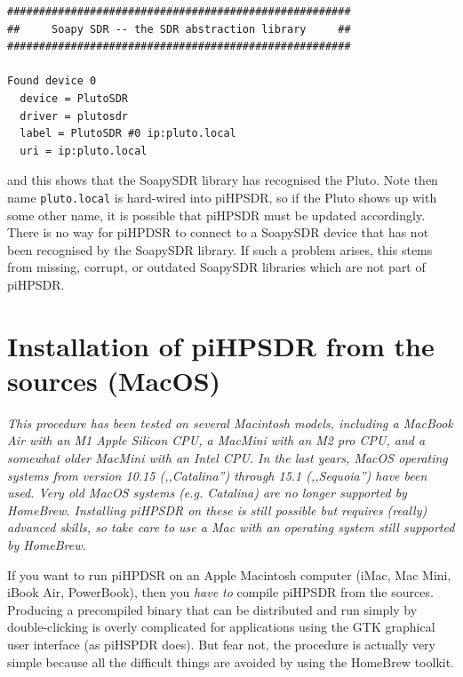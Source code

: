 \documentclass[12pt]{book}
\def\pH{pi\-HPSDR\xspace}
\begin{document}
\begin{small}
\begin{verbatim}
######################################################
##     Soapy SDR -- the SDR abstraction library     ##
######################################################

Found device 0
  device = PlutoSDR
  driver = plutosdr
  label = PlutoSDR #0 ip:pluto.local
  uri = ip:pluto.local
\end{verbatim}
\end{small}

and this shows that the SoapySDR library has recognised the Pluto. Note then name \texttt{pluto.local}
is hard-wired into \pH, so if the Pluto shows up with some other name, it is possible that
\pH must be updated accordingly. There is no way for piHPDSR to connect
to a SoapySDR device that has not been recognised by the SoapySDR library. If such a problem arises, this
stems from missing, corrupt, or outdated SoapySDR libraries which are not part of \pH.

\chapter[MacOS: piHPDSR install from sources]{Installation of \pH from the sources (MacOS)}
\label{sec:installmacosx}

\textit{This procedure has been tested on several Macintosh models, including a MacBook Air with an
M1 Apple Silicon CPU, a MacMini with an M2 pro CPU, and a somewhat older MacMini with an Intel CPU.
In the last years, MacOS operating systems from version 10.15 (,,Catalina'') through 15.1 (,,Sequoia'')
have been used. Very old MacOS systems (e.g. Catalina) are no longer supported by HomeBrew. Installing
\pH on these is still possible but requires (really) advanced skills, so take care to use a Mac with an operating
system still supported by HomeBrew.}

If you want to run piHPDSR on an Apple Macintosh computer (iMac, Mac Mini, iBook Air, PowerBook), then
you \textit{have to} compile \pH from the sources. Producing a precompiled binary that can be
distributed and run simply by double-clicking is overly complicated for applications using the GTK
graphical user interface (as piHSPDR does). But fear not, the procedure is actually very simple because
all the difficult things are avoided by using the HomeBrew toolkit.
\end{document}

